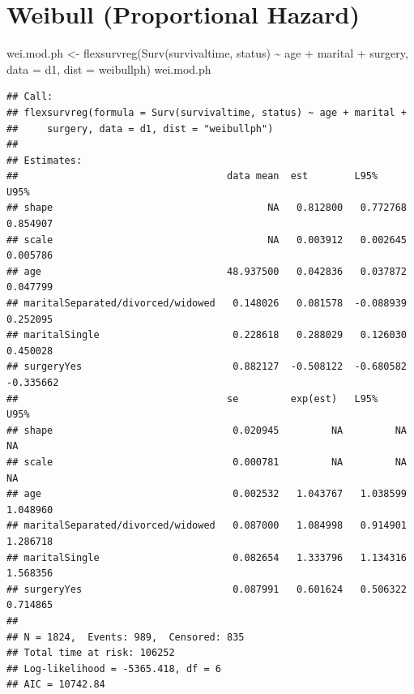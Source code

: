 \documentclass[
  10pt,
]{krantz}
\newenvironment{Shaded}{\begin{snugshade}}{\end{snugshade}}
\newcommand{\AttributeTok}[1]{\textcolor[rgb]{0.77,0.63,0.00}{#1}}
\newcommand{\FunctionTok}[1]{\textcolor[rgb]{0.00,0.00,0.00}{#1}}
\newcommand{\NormalTok}[1]{#1}
\newcommand{\OtherTok}[1]{\textcolor[rgb]{0.56,0.35,0.01}{#1}}
\newcommand{\SpecialCharTok}[1]{\textcolor[rgb]{0.00,0.00,0.00}{#1}}
\newcommand{\StringTok}[1]{\textcolor[rgb]{0.31,0.60,0.02}{#1}}
\begin{document}
\hypertarget{weibull-proportional-hazard}{%
\section{\texorpdfstring{Weibull (Proportional Hazard)}{Weibull (Proportional Hazard)}}\label{weibull-proportional-hazard}}

\begin{Shaded}
\begin{Highlighting}[]
\NormalTok{wei.mod.ph }\OtherTok{\textless{}{-}} \FunctionTok{flexsurvreg}\NormalTok{(}\FunctionTok{Surv}\NormalTok{(survivaltime, status) }\SpecialCharTok{\textasciitilde{}}\NormalTok{ age }\SpecialCharTok{+}\NormalTok{ marital }\SpecialCharTok{+}\NormalTok{ surgery, }
                           \AttributeTok{data =}\NormalTok{ d1, }\AttributeTok{dist =} \StringTok{\textquotesingle{}weibullph\textquotesingle{}}\NormalTok{)}
\NormalTok{wei.mod.ph}
\end{Highlighting}
\end{Shaded}

\begin{verbatim}
## Call:
## flexsurvreg(formula = Surv(survivaltime, status) ~ age + marital + 
##     surgery, data = d1, dist = "weibullph")
## 
## Estimates: 
##                                    data mean  est        L95%       U95%     
## shape                                     NA   0.812800   0.772768   0.854907
## scale                                     NA   0.003912   0.002645   0.005786
## age                                48.937500   0.042836   0.037872   0.047799
## maritalSeparated/divorced/widowed   0.148026   0.081578  -0.088939   0.252095
## maritalSingle                       0.228618   0.288029   0.126030   0.450028
## surgeryYes                          0.882127  -0.508122  -0.680582  -0.335662
##                                    se         exp(est)   L95%       U95%     
## shape                               0.020945         NA         NA         NA
## scale                               0.000781         NA         NA         NA
## age                                 0.002532   1.043767   1.038599   1.048960
## maritalSeparated/divorced/widowed   0.087000   1.084998   0.914901   1.286718
## maritalSingle                       0.082654   1.333796   1.134316   1.568356
## surgeryYes                          0.087991   0.601624   0.506322   0.714865
## 
## N = 1824,  Events: 989,  Censored: 835
## Total time at risk: 106252
## Log-likelihood = -5365.418, df = 6
## AIC = 10742.84
\end{verbatim}
\end{document}
